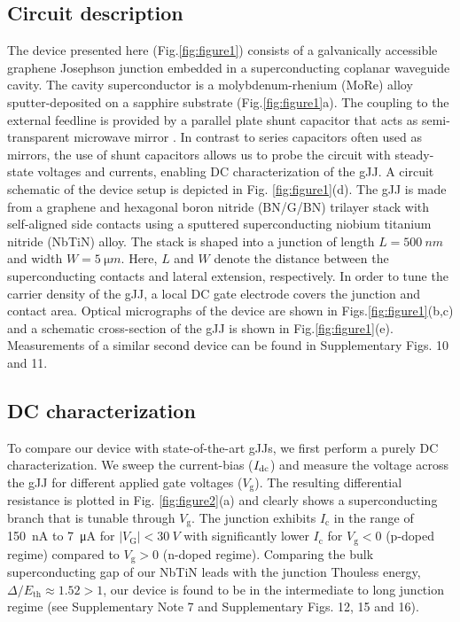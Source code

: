 \subsection{Circuit description}

The device presented here (Fig.\ref{fig:figure1}) consists of a galvanically accessible graphene Josephson junction embedded in a superconducting coplanar waveguide cavity.
The cavity superconductor is a molybdenum-rhenium (MoRe) alloy sputter-deposited on a sapphire substrate (Fig.\ref{fig:figure1}a).
The coupling to the external feedline is provided by a parallel plate shunt capacitor that acts as semi-transparent microwave mirror \cite{bosman_broadband_2015,singh_molybdenumrhenium_2014}.
In contrast to series capacitors often used as mirrors, the use of shunt capacitors allows us to probe the circuit with steady-state voltages and currents, enabling DC characterization of the gJJ.
A circuit schematic of the device setup is depicted in Fig. \ref{fig:figure1}(d).
The gJJ is made from a graphene and hexagonal boron nitride (BN/G/BN) trilayer stack with self-aligned side contacts \cite{pizzocchero_hot_2016,wang_onedimensional_2013} using a sputtered superconducting niobium titanium nitride (NbTiN) alloy.
The stack is shaped into a junction of length $L=\SI{500}{nm}$ and width $W=\SI{5}{\micro m}$.
Here, $L$ and $W$ denote the distance between the superconducting contacts and lateral extension, respectively.
In order to tune the carrier density of the gJJ, a local DC gate electrode covers the junction and contact area.
Optical micrographs of the device are shown in Figs.\ref{fig:figure1}(b,c) and a schematic cross-section of the gJJ is shown in Fig.\ref{fig:figure1}(e).
Measurements of a similar second device can be found in Supplementary Figs. 10 and 11.

\subsection{DC characterization}

To compare our device with state-of-the-art gJJs, we first perform a purely DC characterization.
We sweep the current-bias ($I_{\rm dc}$) and measure the voltage across the gJJ for different applied gate voltages ($V_\textrm{g}$).
The resulting differential resistance is plotted in Fig. \ref{fig:figure2}(a) and clearly shows a superconducting branch that is tunable through $V_\textrm{g}$.
The junction exhibits $I_\textrm{c}$ in the range of \SI{150}{nA} to \SI{7}{\micro A} for $\lvert V_\mathrm{G} \rvert<\SI{30}{V}$ with significantly lower $I_\textrm{c}$ for $V_\textrm{g}<0$ (p-doped regime) compared to $V_\textrm{g}>0$ (n-doped regime).
Comparing the bulk superconducting gap of our NbTiN leads with the junction Thouless energy, $\Delta/E_\textrm{th}\approx1.52>1$, our device is found to be in the intermediate to long junction regime (see Supplementary Note 7 and Supplementary Figs. 12, 15 and 16).

